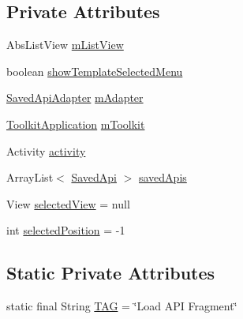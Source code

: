 \subsection*{Private Attributes}
\begin{DoxyCompactItemize}
\item 
Abs\+List\+View \hyperlink{classorg_1_1buildmlearn_1_1toolkit_1_1fragment_1_1LoadApkFragment_af42332738c3a884fd0114a7db4f8907d}{m\+List\+View}
\item 
boolean \hyperlink{classorg_1_1buildmlearn_1_1toolkit_1_1fragment_1_1LoadApkFragment_a9108b61bdaacd90cb6f12bde0ede5c37}{show\+Template\+Selected\+Menu}
\item 
\hyperlink{classorg_1_1buildmlearn_1_1toolkit_1_1adapter_1_1SavedApiAdapter}{Saved\+Api\+Adapter} \hyperlink{classorg_1_1buildmlearn_1_1toolkit_1_1fragment_1_1LoadApkFragment_a86ee7efda8a4e73b29484e145671f8af}{m\+Adapter}
\item 
\hyperlink{classorg_1_1buildmlearn_1_1toolkit_1_1ToolkitApplication}{Toolkit\+Application} \hyperlink{classorg_1_1buildmlearn_1_1toolkit_1_1fragment_1_1LoadApkFragment_a69fd3ddf6462231500d199a9ba8b18ec}{m\+Toolkit}
\item 
Activity \hyperlink{classorg_1_1buildmlearn_1_1toolkit_1_1fragment_1_1LoadApkFragment_a125f2694f11b36f0cf215fa84c519990}{activity}
\item 
Array\+List$<$ \hyperlink{classorg_1_1buildmlearn_1_1toolkit_1_1model_1_1SavedApi}{Saved\+Api} $>$ \hyperlink{classorg_1_1buildmlearn_1_1toolkit_1_1fragment_1_1LoadApkFragment_ad504c641a9080d4d05b1704e9b1a25a5}{saved\+Apis}
\item 
View \hyperlink{classorg_1_1buildmlearn_1_1toolkit_1_1fragment_1_1LoadApkFragment_ad881d20e6feeff2204638f1370592ac2}{selected\+View} = null
\item 
int \hyperlink{classorg_1_1buildmlearn_1_1toolkit_1_1fragment_1_1LoadApkFragment_a41fead0d2295b8fd7f2f7bfb168470d7}{selected\+Position} = -\/1
\end{DoxyCompactItemize}
\subsection*{Static Private Attributes}
\begin{DoxyCompactItemize}
\item 
static final String \hyperlink{classorg_1_1buildmlearn_1_1toolkit_1_1fragment_1_1LoadApkFragment_a6802d1e781be3f554576595f6f68f794}{T\+AG} = \char`\"{}Load A\+PI Fragment\char`\"{}
\end{DoxyCompactItemize}


